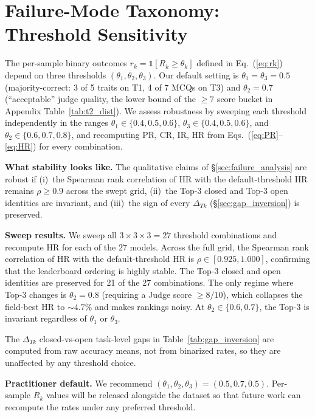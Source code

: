 \documentclass{llmxive}
\begin{document}
\section{Failure-Mode Taxonomy: Threshold Sensitivity}
\label{app:threshold}

The per-sample binary outcomes $r_k=\mathbb{1}[R_k\!\geq\!\theta_k]$ defined in Eq.~(\ref{eq:rk}) depend on three thresholds $(\theta_1, \theta_2, \theta_3)$. Our default setting is $\theta_1\!=\!\theta_3\!=\!0.5$ (majority-correct: 3 of 5 traits on T1, 4 of 7 MCQs on T3) and $\theta_2\!=\!0.7$ (``acceptable'' judge quality, the lower bound of the $\geq\!7$ score bucket in Appendix Table~\ref{tab:t2_dist}). We assess robustness by sweeping each threshold independently in the ranges $\theta_1 \in \{0.4, 0.5, 0.6\}$, $\theta_3 \in \{0.4, 0.5, 0.6\}$, and $\theta_2 \in \{0.6, 0.7, 0.8\}$, and recomputing PR, CR, IR, HR from Eqs.~(\ref{eq:PR}--\ref{eq:HR}) for every combination.

\noindent\textbf{What stability looks like.} The qualitative claims of \S\ref{sec:failure_analysis} are robust if (i)~the Spearman rank correlation of HR with the default-threshold HR remains $\rho\!\geq\!0.9$ across the swept grid, (ii)~the Top-3 closed and Top-3 open identities are invariant, and (iii)~the sign of every $\Delta_{Tk}$ (\S\ref{sec:gap_inversion}) is preserved.

\noindent\textbf{Sweep results.} We sweep all $3\!\times\!3\!\times\!3\!=\!27$ threshold combinations and recompute HR for each of the 27 models. Across the full grid, the Spearman rank correlation of HR with the default-threshold HR is $\rho\!\in\![0.925, 1.000]$, confirming that the leaderboard ordering is highly stable. The Top-3 closed and open identities are preserved for 21 of the 27 combinations. The only regime where Top-3 changes is $\theta_2\!=\!0.8$ (requiring a Judge score $\geq\!8/10$), which collapses the field-best HR to $\sim\!4.7\%$ and makes rankings noisy. At $\theta_2\!\in\!\{0.6, 0.7\}$, the Top-3 is invariant regardless of $\theta_1$ or $\theta_3$.

The $\Delta_{Tk}$ closed-vs-open task-level gaps in Table~\ref{tab:gap_inversion} are computed from raw accuracy means, not from binarized rates, so they are unaffected by any threshold choice.

\noindent\textbf{Practitioner default.} We recommend $(\theta_1, \theta_2, \theta_3)\!=\!(0.5, 0.7, 0.5)$. Per-sample $R_k$ values will be released alongside the dataset so that future work can recompute the rates under any preferred threshold.
\end{document}
